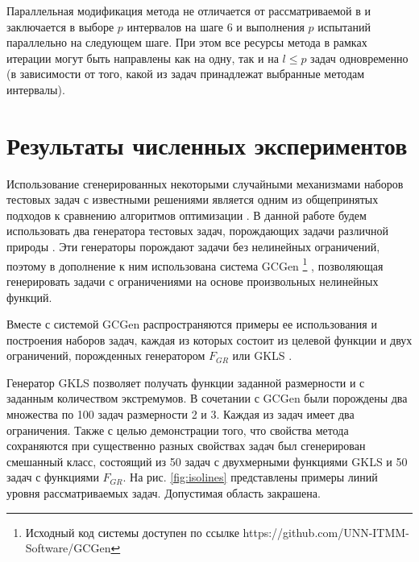 \documentclass{cmi}
\begin{document}
Параллельная модификация метода не отличается от рассматриваемой в \cite{BarkalovStrongin2018}
и заключается в выборе \(p\) интервалов на шаге 6 и выполнения \(p\) испытаний параллельно
на следующем шаге. При этом все ресурсы метода в рамках итерации могут быть направлены как на одну, так и
на \(l\leqslant p\) задач одновременно (в зависимости от того, какой из задач принадлежат выбранные методам интервалы).

\section{Результаты численных экспериментов}

Использование сгенерированных некоторыми случайными механизмами
наборов тестовых задач с известными решениями является одним из общепринятых подходов
к сравнению алгоритмов оптимизации \cite{Beiranvand2017}. В данной работе
будем использовать два генератора тестовых задач, порождающих задачи различной природы \cite{grishaginClass, Gaviano2003}.
Эти генераторы порождают задачи без нелинейных ограничений, поэтому в дополнение к ним использована
система GCGen \footnote{Исходный код системы доступен по ссылке https://github.com/UNN-ITMM-Software/GCGen} \cite{GergelBarkalov2019}, позволяющая генерировать задачи с ограничениями на основе произвольных нелинейных
функций.

Вместе с системой GCGen распространяются примеры ее использования и построения
наборов задач, каждая из которых состоит из целевой функции и двух ограничений,
порожденных генератором \(F_{GR}\) \cite{grishaginClass} или GKLS \cite{Gaviano2003}.


Генератор GKLS \cite{Gaviano2003} позволяет получать функции заданной размерности и с заданным количеством экстремумов.
В сочетании с GCGen были порождены два множества по 100 задач размерности 2 и 3. Каждая из задач имеет два ограничения.
Также с целью демонстрации того, что свойства метода сохраняются при существенно разных свойствах задач
был сгенерирован смешанный класс, состоящий из 50 задач с двухмерными функциями GKLS и 50 задач с функциями \(F_{GR}\).
На рис. \ref{fig:isolines} представлены примеры линий уровня рассматриваемых задач. Допустимая область закрашена.
\end{document}
